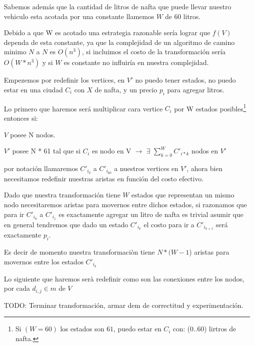 \documentclass[12pt]{article}
\begin{document}
Sabemos además que la cantidad de litros de nafta que puede llevar nuestro vehiculo esta acotada por una constante llamemos $W$ de 60 litros. 

Debido a que W es acotado una estrategia razonable sería lograr que $f(V)$ dependa de esta constante, ya que la complejidad de un algoritmo de camino minimo $N$ a $N$ es $O(n^3)$, si incluimos el costo de la transformación sería $O(W * n^3)$ y si $W$ es constante no influiría en nuestra complejidad.

Empezemos por redefinir los vertices, en $V'$ no puedo tener estados, no puedo estar en una ciudad $C_i$ con $X$ de nafta, y un precio $p_i$ para agregar litros.

Lo primero que haremos será multiplicar cara vertice $C_i$ por W estados posibles\footnote{Si $(W = 60)$ los estados son $61$, puedo estar en $C_i$ con: (0..60) lirtros de nafta.} entonces si:

$V$ posee  N nodos. 

$V'$ posee N * 61 tal que si $C_i$ es nodo en V $\rightarrow$ $\exists$ $\sum_{k=0}^{W} C'_{i * k}$ nodos en $V'$

por notación llamaremos $C'_{i_0}$ a $C'_{i_{60}}$ a nuestros vertices en $V'$, ahora bien necesitamos redefinir nuestras aristas en función del costo efectivo.

Dado que nuestra transformación tiene $W$ estados que representan un mismo nodo necesitaremos aristas para movernos entre dichos estados, si razonamos que para ir $C'_{i_0}$ a $C'_{i_1}$ es exactamente agregar un litro de nafta es trivial asumir que en general tendremos que dado un estado $C'_{i_k}$ el costo para ir a $C'_{i_{k+1}}$ será exactamente $p_i$.

Es decir de momento nuestra transformaciòn tiene  $N * (W - 1$) aristas para movernos entre los estados $C'_{i_k}$

Lo siguiente que haremos serà redefinir como son las conexiones entre los nodos, por cada $d_{i,j} \in m$ de $V$


TODO: Terminar transformación, armar dem de correctitud y experimentación.
\end{document}
